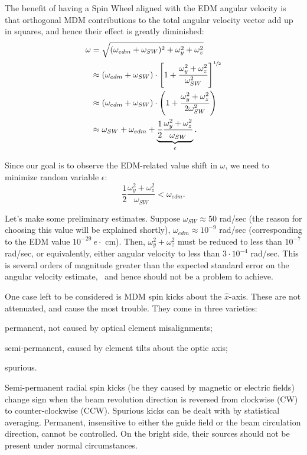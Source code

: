 \documentclass[a4paper]{jacow}
\newcommand{\w}{\omega}
\newcommand{\wedm}{\w_{edm}}
\newcommand{\wsw}{\w_{SW}}
\begin{document}
The benefit of having a Spin Wheel aligned with the EDM angular velocity is that orthogonal MDM contributions
to the total angular velocity vector add up in squares, and hence their effect is greatly diminished:
\begin{align*}
  \w &= \sqrt{(\wedm + \wsw)^2 + \w_y^2 + \w_z^2} \\
  &\approx(\wedm + \wsw)\cdot \bkt*{1 + \frac{\w_y^2 + \w_z^2}{\wsw^2}}^{\sfrac12} \\
  &\approx (\wedm + \wsw)\cdot \bkt{1 + \frac{\w_y^2 + \w_z^2}{2\wsw^2}} \\
  &\approx \wsw + \wedm + \underbrace{\frac12\frac{\w_y^2 + \w_z^2}{\wsw}}_{\epsilon}.
\end{align*}

Since our goal is to observe the EDM-related value shift in $\w$, we need to minimize random variable
$\epsilon$:
\[
\frac12\frac{\w_y^2 + \w_z^2}{\wsw} < \wedm.
\]

Let's make some preliminary estimates. Suppose $\wsw\approx 50$ rad/sec (the reason for choosing this
value will be explained shortly), $\wedm\approx10^{-9}$ rad/sec (corresponding to the EDM value
$10^{-29}~e\cdot$ cm). Then, $\w_y^2 + \w_z^2$ must be reduced to less than $10^{-7}$ rad/sec, or equivalently,
either angular velocity to less than $3\cdot 10^{-4}$ rad/sec. This is several orders of magnitude greater than
the expected standard error on the angular velocity estimate,~\cite{Aksentev:Stats} and hence
should not be a problem to achieve.

One case left to be considered is MDM spin kicks about the $\hat x$-axis. These are not attenuated, and cause the
most trouble. They come in three varieties:
\begin{inparaenum}
\item permanent, not caused by optical element misalignments;
\item semi-permanent, caused by element tilts about the optic axis;
\item spurious.
\end{inparaenum}

Semi-permanent radial spin kicks (be they caused by magnetic or electric fields) change sign when
the beam revolution direction is reversed from clockwise (CW) to counter-clockwise (CCW).
Spurious kicks can be dealt with by statistical averaging.
Permanent, insensitive to either the guide field or the beam circulation direction, cannot be controlled.
On the bright side, their sources should not be present under normal circumstances.
\end{document}
